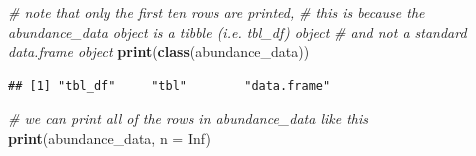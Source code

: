 \documentclass[12pt,]{book}
\newenvironment{Shaded}{\begin{snugshade}}{\end{snugshade}}
\newcommand{\KeywordTok}[1]{\textcolor[rgb]{0.13,0.29,0.53}{\textbf{#1}}}
\newcommand{\DataTypeTok}[1]{\textcolor[rgb]{0.13,0.29,0.53}{#1}}
\newcommand{\CommentTok}[1]{\textcolor[rgb]{0.56,0.35,0.01}{\textit{#1}}}
\newcommand{\OtherTok}[1]{\textcolor[rgb]{0.56,0.35,0.01}{#1}}
\newcommand{\NormalTok}[1]{#1}
\begin{document}
\clearpage

\begin{Shaded}
\begin{Highlighting}[]
\CommentTok{# note that only the first ten rows are printed,}
\CommentTok{# this is because the abundance_data object is a tibble (i.e. tbl_df) object}
\CommentTok{# and not a standard data.frame object}
\KeywordTok{print}\NormalTok{(}\KeywordTok{class}\NormalTok{(abundance_data))}
\end{Highlighting}
\end{Shaded}

\begin{verbatim}
## [1] "tbl_df"     "tbl"        "data.frame"
\end{verbatim}

\begin{Shaded}
\begin{Highlighting}[]
\CommentTok{# we can print all of the rows in abundance_data like this}
\KeywordTok{print}\NormalTok{(abundance_data, }\DataTypeTok{n =} \OtherTok{Inf}\NormalTok{)}
\end{Highlighting}
\end{Shaded}
\end{document}
